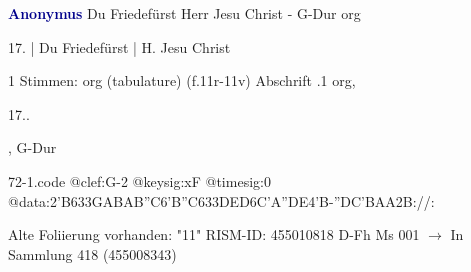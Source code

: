 \documentclass[twocolumn]{book}
\begin{document}
\newline \par \vspace{7pt} \textcolor{darkblue}{\textbf{Anonymus  }}
\newline Du Friedefürst Herr Jesu Christ - G-Dur
\newline org
\newline \begin{itshape}[f.11r, at left:] 17. | Du Friedefürst | H. Jesu Christ\end{itshape} 
\newline \textcolor{darkblue}{}  1 Stimmen: org (tabulature)  (f.11r-11v)
\newline Abschrift
.1  org, \begin{itshape}17..\end{itshape}, G-Dur  
\begin{filecontents*}{72-1.code}
@clef:G-2
@keysig:xF
@timesig:0
@data:2'B{633GAB}{AB''C}{6'B''C}{633DED}{6C'A''DE}4'B-''DC'BAA2B://:
\end{filecontents*}
\newline
%
\newline Alte Foliierung vorhanden: "11"
\newline RISM-ID: 455010818
\newline D-Fh  Ms 001
\newline $\rightarrow$ In Sammlung 418 (455008343)
      
\end{document}
